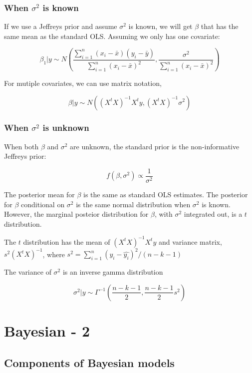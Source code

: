 \documentclass[]{book}
\begin{document}
\subsection{\texorpdfstring{When \(\sigma^2\) is
known}{When \textbackslash{}sigma\^{}2 is known}}\label{when-sigma2-is-known}

If we use a Jeffreys prior and assume \(\sigma^2\) is known, we will get
\(\beta\) that has the same mean as the standard OLS. Assuming we only
has one covariate:

\[\beta_1|y \sim N(\frac{\sum_{i=1}^n (x_i-\bar{x})(y_i-\bar{y})}{\sum_{i=1}^n(x_i-\bar{x})^2},\frac{\sigma^2}{\sum_{i=1}^n(x_i-\bar{x})^2})\]

For mutiple covariates, we can use matrix notation,

\[\beta|y \sim N((X^tX)^{-1}X^ty,(X^tX)^{-1}\sigma^2)\]

\subsection{\texorpdfstring{When \(\sigma^2\) is
unknown}{When \textbackslash{}sigma\^{}2 is unknown}}\label{when-sigma2-is-unknown}

When both \(\beta\) and \(\sigma^2\) are unknown, the standard prior is
the non-informative Jeffreys prior:

\[f(\beta, \sigma^2) \propto \frac{1}{\sigma^2}\]

The posterior mean for \(\beta\) is the same as standard OLS estimates.
The posterior for \(\beta\) conditional on \(\sigma^2\) is the same
normal distribution when \(\sigma^2\) is known. However, the marginal
posteior distribution for \(\beta\), with \(\sigma^2\) integrated out,
is a \(t\) distribution.

The \(t\) distribution has the mean of \((X^tX)^{-1}X^ty\) and variance
matrix, \(s^2(X^tX)^{-1}\), where
\(s^2=\sum_{i=1}^n(y_i-\hat{y_i})^2/(n-k-1)\)

The variance of \(\sigma^2\) is an inverse gamma distribution

\[\sigma^2|y \sim \Gamma^{-1}(\frac{n-k-1}{2},\frac{n-k-1}{2}s^2)\]

\chapter{Bayesian - 2}\label{bayesian---2}

\section{Components of Bayesian
models}\label{components-of-bayesian-models}
\end{document}
